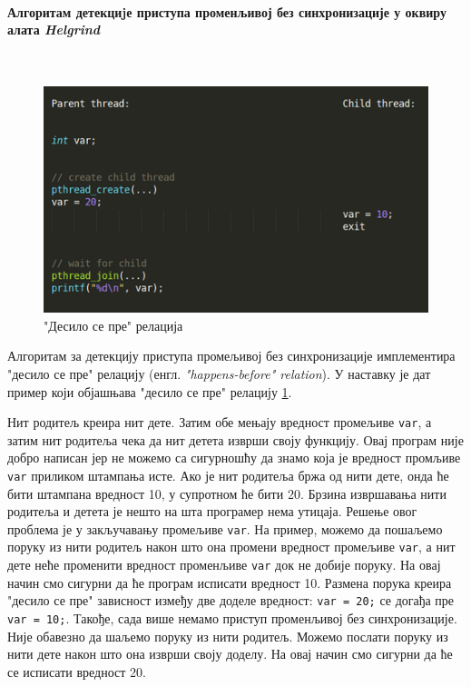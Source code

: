 \documentclass[12pt,oneside]{memoir}
\begin{document}
\paragraph{Алгоритам детекциjе приступа променљивој без синхронизације у оквиру алата \textit{Helgrind}} \mbox{}\\

\begin{figure}[h!]
\begin{center}
\includegraphics[scale=0.75]{slika16.png}
\end{center}
\caption{"Десило се пре" релација}
\label{fig:dspPrincip}
\end{figure}


\indent Алгоритам за детекцију приступа промељивој без синхронизације имплементира "десило се пре" релацију (енгл. \textit{"happens-before" relation}). У наставку је дат пример који објашњава "десило се пре" релацију \ref{fig:dspPrincip}.

\indent Нит родитељ креира нит дете. Затим обе мењају вредност промељиве \texttt{var}, а затим нит родитеља чека да нит детета изврши своју функцију. Овај програм није добро написан јер не можемо са сигурношћу да знамо која је вредност промљиве \texttt{var} приликом штампања исте. Ако је нит родитеља бржа од нити дете, онда ће бити штампана вредност 10, у супротном ће бити 20. Брзина извршавања нити родитеља и детета је нешто на шта програмер нема утицаја. Решење овог проблема је у закључавању промељиве \texttt{var}. На пример, можемо да пошаљемо поруку из нити родитељ након што она промени вредност промељиве \texttt{var}, а нит дете неће променити вредност променљиве \texttt{var} док не добије поруку. На овај начин смо сигурни  да ће програм исписати вредност 10. Размена порука креира "десило се пре" зависност између две доделе вредност: \texttt{var = 20;} се догађа пре \texttt{var = 10;}. Такође, сада више немамо приступ променљивој без синхронизације. Није обавезно да шаљемо поруку из нити родитељ. Можемо послати поруку из нити дете након што она изврши своју доделу. На овај начин смо сигурни да ће се исписати вредност 20.
\end{document}
